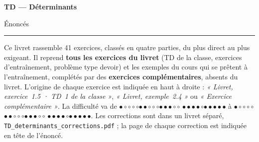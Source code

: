 \documentclass[a4paper,11pt]{article}
\numberwithin{equation}{section}
\numberwithin{figure}{section}
\numberwithin{table}{section}
\theoremstyle{enonce}
\theoremstyle{exemple}
\theoremstyle{remarque}
\newcommand{\niveau}[1]{{\color{Ocre}\footnotesize
  \ifcase#1\or$\bullet\circ\circ\circ\circ$\or$\bullet\bullet\circ\circ\circ$\or$\bullet\bullet\bullet\circ\circ$%
  \or$\bullet\bullet\bullet\bullet\circ$\or$\bullet\bullet\bullet\bullet\bullet$\fi}}
\begin{document}
\thispagestyle{plain}
{\sffamily\small\color{Gris}}\par\vspace{0.2em}
{\sffamily\bfseries\fontsize{26}{30}\selectfont\color{Ink}TD --- Déterminants}\par\vspace{0.3em}
{\sffamily\Large\color{BleuMoyen}Énoncés}\par\vspace{0.4em}
{\color{Ocre}\rule{3.2cm}{1.4pt}}\par\vspace{0.8em}
{\small Ce livret rassemble 41 exercices, classés en quatre parties, du plus direct au plus exigeant.
Il reprend \textbf{tous les exercices du livret} (TD de la classe, exercices d'entraînement, problème type devoir) et les exemples
du cours qui se prêtent à l'entraînement, complétés par des \textbf{exercices complémentaires}, absents du livret.
L'origine de chaque exercice est indiquée en haut à droite : \emph{« Livret, exercice~1.5 · TD~1 de la classe »}, \emph{« Livret, exemple~2.4 »}
ou \emph{« Exercice complémentaire »}. La difficulté va de \niveau{1} à \niveau{5}.
Les corrections sont dans un livret séparé, \texttt{TD\_determinants\_corrections.pdf} ; la page de chaque correction est indiquée en tête de l'énoncé.}
\end{document}

